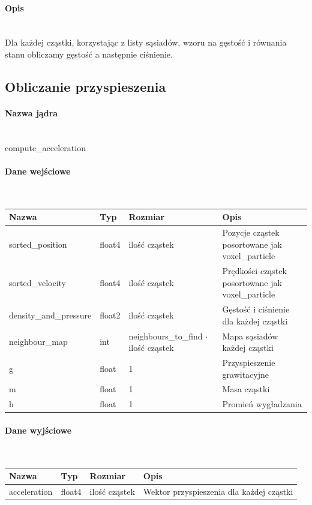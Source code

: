 \documentclass[polish, 12pt]{aghthesis}
\begin{document}
				\paragraph{Opis} \ \\
					\indent Dla każdej cząstki, korzystając z listy sąsiadów, wzoru na gęstość i równania stanu obliczamy gęstość a następnie ciśnienie. 
		\subsection{Obliczanie przyspieszenia}
				\paragraph{Nazwa jądra} \ \\
					compute\_acceleration
				\paragraph{Dane wejściowe} \ \\
					\begin{tabular}{| p{} | p{} | p{} | p{} |}
					\hline
						Nazwa & Typ & Rozmiar & Opis \\
					\hline
						sorted\_position & float4 & ilość cząstek & Pozycje cząstek posortowane jak voxel\_particle\\
					\hline
						sorted\_velocity & float4 & ilość cząstek & Prędkości cząstek posortowane jak voxel\_particle\\
					\hline
						density\_and\_pressure & float2 & ilość cząstek & Gęstość i ciśnienie dla każdej cząstki\\
					\hline
						neighbour\_map & int & neighbours\_to\_find ${\cdot}$ ilość cząstek & Mapa sąsiadów każdej cząstki\\
					\hline
						g & float & 1 & Przyspieszenie grawitacyjne \\ 
					\hline
						m & float & 1 & Masa cząstki \\ 
					\hline
						h & float & 1 & Promień wygładzania \\ 
					\hline	
				\end{tabular}
				\paragraph{Dane wyjściowe} \ \\
					\begin{tabular}{| p{} | p{} | p{} | p{} |}
					\hline
						Nazwa & Typ & Rozmiar & Opis \\
					\hline
						acceleration & float4 & ilość cząstek & Wektor przyspieszenia dla każdej cząstki\\
					\hline
				\end{tabular}
\end{document}
